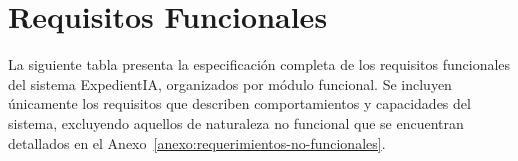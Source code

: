 \documentclass[12pt,a4paper,oneside]{book}
\begin{document}
\appendix

\chapter{Requisitos Funcionales}
\label{anexo:requerimientos-funcionales}

La siguiente tabla presenta la especificación completa de los requisitos funcionales del sistema ExpedientIA, organizados por módulo funcional. Se incluyen únicamente los requisitos que describen comportamientos y capacidades del sistema, excluyendo aquellos de naturaleza no funcional que se encuentran detallados en el Anexo~\ref{anexo:requerimientos-no-funcionales}.
\end{document}
